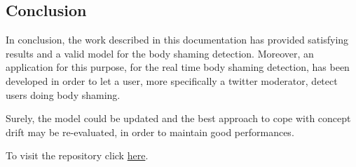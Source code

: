 \subsection{Conclusion}

In conclusion, the work described in this documentation has provided satisfying results and a valid model for the body shaming detection. 
Moreover, an application for this purpose, for the real time body shaming detection, has been developed in order to let a user, more specifically a twitter moderator, detect users doing body shaming. 

Surely, the model could be updated and the best approach to cope with concept drift may be re-evaluated, in order to maintain good performances. 

\vspace{5mm}
\vspace{5mm}
\vspace{5mm}

\noindent
To visit the repository click \href{https://github.com/martimarino/Body-shaming-detection.git}{here}.